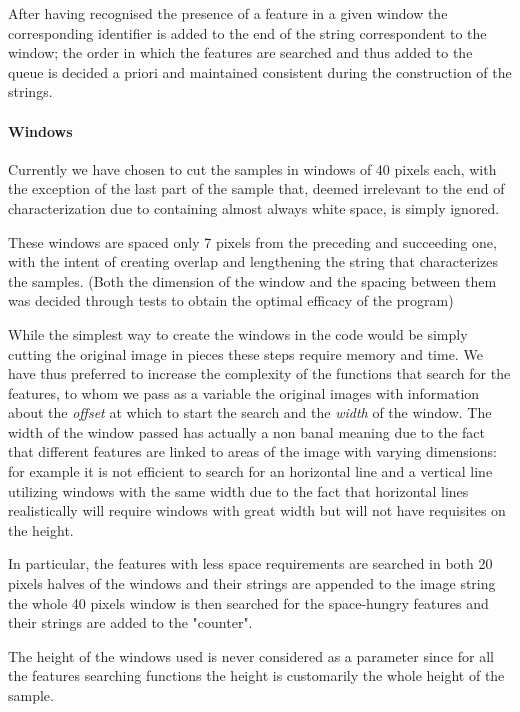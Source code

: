 After having recognised the presence of a feature in a given window the corresponding identifier is added to the end of the string correspondent to the window; the order in which the features are searched and thus added to the queue is decided a priori and maintained consistent during the construction of the strings. 


\paragraph{Windows}

Currently we have chosen to cut the samples in windows of 40 pixels each, with the exception of the last part of the sample that, deemed irrelevant to the end of characterization due to containing almost always white space, is simply ignored.

These windows are spaced only 7 pixels from the preceding and succeeding one, with the intent of creating overlap and lengthening the string that characterizes the samples.
(Both the dimension of the window and the spacing between them was decided through tests to obtain the optimal efficacy of the program)

While the simplest way to create the windows in the code would be simply cutting the original image in pieces these steps require memory and time. We have thus preferred to increase the complexity of the functions that search for the features, to whom we pass as a variable the original images with information about the \textit{offset} at which to start the search and the \textit{width} of the window. The width of the window passed has actually a non banal meaning due to the fact that different features are linked to areas of the image with varying dimensions: for example it is not efficient to search for an horizontal line and a vertical line utilizing windows with the same width due to the fact that horizontal lines realistically will require windows with great width but will not have requisites on the height.

In particular, the features with less space requirements are searched in both 20 pixels halves of the windows and their strings are appended to the image string the whole 40 pixels window is then searched for the space-hungry features and their strings are added to the "counter". 

The height of the windows used is never considered as a parameter since for all the features searching functions the height is customarily the whole height of the sample.  

